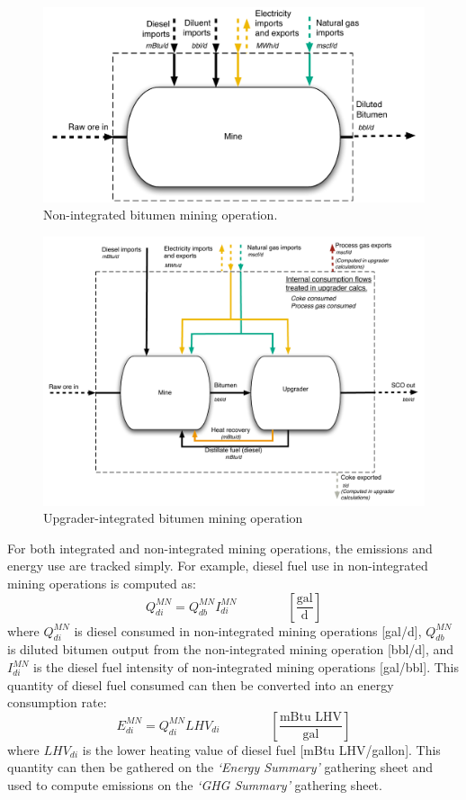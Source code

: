 \documentclass[11pt]{report}
\newcommand{\sheet}[1]{\textit{`{#1}'}}
\newcommand{\eqnunitfrac}[2]{\quad\quad \scriptstyle{\left[\frac{\text{#1}}{\text{#2}}\right]}}
\begin{document}
\begin{figure}[t]
\includegraphics[width=0.9\columnwidth]{images/Mining_NInt.pdf}
\caption{Non-integrated bitumen mining operation.}
\label{fig:pfd_mining_nint}
\end{figure}


\begin{figure}[t]
\includegraphics[width=1\columnwidth]{images/Mining_Int.pdf}
\caption{Upgrader-integrated bitumen mining operation}
\label{fig:pfd_mining_int}
\end{figure}

For both integrated and non-integrated mining operations, the emissions and energy use are tracked simply.  For example, diesel fuel use in non-integrated mining operations is computed as:
\begin{equation}\label{eq:dieselmine}
Q_{di}^{MN} = Q_{db}^{MN} I_{di}^{MN} \quad\quad\eqnunitfrac{gal}{d}
\end{equation}
where $Q_{di}^{MN}$ is diesel consumed in non-integrated mining operations [gal/d], $Q_{db}^{MN}$ is diluted bitumen output from the non-integrated mining operation [bbl/d], and $I_{di}^{MN}$ is the diesel fuel intensity of non-integrated mining operations [gal/bbl].  This quantity of diesel fuel consumed can then be converted into an energy consumption rate:
\begin{equation}
E_{di}^{MN} = Q_{di}^{MN} LHV_{di} \quad\quad\eqnunitfrac{mBtu LHV}{gal}
\end{equation}
where $LHV_{di}$ is the lower heating value of diesel fuel [mBtu LHV/gallon].  This quantity can then be gathered on the \sheet{Energy Summary} gathering sheet and used to compute emissions on the \sheet{GHG Summary} gathering sheet.
\end{document}
